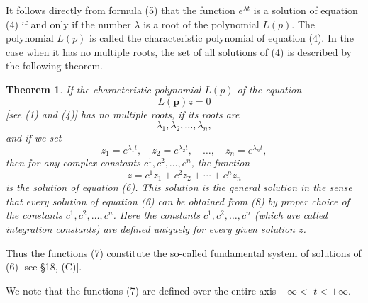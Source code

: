 \documentclass[10pt,a5paper]{book}
\theoremstyle{plain}
\newtheorem{theorem}{Theorem}
\theoremstyle{definition}
\theoremstyle{remark}
\begin{document}
It follows directly from formula (5) that the function $e^{\lambda t}$ is a solution of equation (4) if and only if the number $\lambda$ is a root of the polynomial $L(p)$. The polynomial $L(p)$ is called the characteristic polynomial of equation (4). In the case when it has no multiple roots, the set of all solutions of (4) is described by the following theorem.

\begin{theorem}
If the characteristic polynomial $L(p)$ of the equation
\begin{equation*}
L(\boldsymbol{p}) z=0 \tag{6}
\end{equation*}
[see (1) and (4)] has no multiple roots, if its roots are
\[
\lambda_{1}, \lambda_{2}, \ldots, \lambda_{n},
\]
and if we set
\begin{equation*}
z_{1}=e^{\lambda_{1} t}, \quad z_{2}=e^{\lambda_{2} t}, \quad \ldots, \quad z_{n}=e^{\lambda_{n} t}, \tag{7}
\end{equation*}
then for any complex constants $c^{1}, c^{2}, \ldots, c^{n}$, the function
\begin{equation*}
z=c^{1} z_{1}+c^{2} z_{2}+\cdots+c^{n} z_{n} \tag{8}
\end{equation*}
is the solution of equation (6). This solution is the general solution in the sense that every solution of equation (6) can be obtained from (8) by proper choice of the constants $c^{1}, c^{2}, \ldots, c^{n}$. Here the constants $c^{1}, c^{2}, \ldots, c^{n}$ (which are called integration constants) are defined uniquely for every given solution $z$.
\end{theorem}

Thus the functions (7) constitute the so-called fundamental system of solutions of (6) [see §18, (C)].

We note that the functions (7) are defined over the entire axis $-\infty<$ $t<+\infty$.
\end{document}
